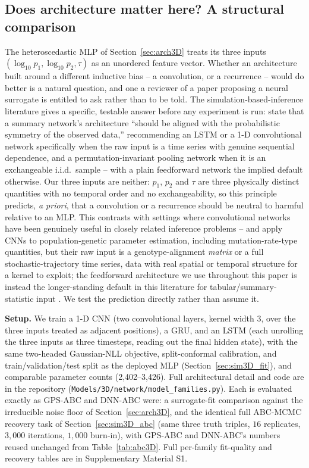 \documentclass[sn-basic,iicol,pdflatex]{sn-jnl}
\begin{document}
\subsection{Does architecture matter here? A structural comparison}
\label{sec:sim3D_arch}

The heteroscedastic MLP of Section~\ref{sec:arch3D} treats its three inputs
$(\log_{10}p_1,\log_{10}p_2,\tau)$ as an unordered feature vector. Whether an
architecture built around a different inductive bias -- a convolution, or a
recurrence -- would do better is a natural question, and one a reviewer of a
paper proposing a neural surrogate is entitled to ask rather than to be told. The
simulation-based-inference literature gives a specific, testable answer before
any experiment is run: \citet{radev2020} state that a summary network's
architecture ``should be aligned with the probabilistic symmetry of the
observed data,'' recommending an LSTM or a 1-D convolutional network
specifically when the raw input is a time series with genuine sequential
dependence, and a permutation-invariant pooling network when it is an
exchangeable i.i.d.\ sample -- with a plain feedforward network the implied
default otherwise. Our three inputs are neither: $p_1$, $p_2$ and $\tau$ are
three physically distinct quantities with no temporal order and no
exchangeability, so this principle predicts, \emph{a priori}, that
a convolution or a recurrence should be neutral to harmful relative to an MLP.
This contrasts with settings where convolutional networks have been genuinely
useful in closely related inference problems -- \citet{flagel2019} and
\citet{akesson2021} apply CNNs to population-genetic parameter estimation,
including mutation-rate-type quantities, but their raw input is a
genotype-alignment \emph{matrix} or a full stochastic-trajectory time series,
data with real spatial or temporal structure for a kernel to exploit; the
feedforward architecture we use throughout this paper is instead the
longer-standing default in this literature for tabular/summary-statistic input
\citep{sheehan2016,jiang2017}. We test the prediction directly rather than
assume it.

\noindent\textbf{Setup.} We train a 1-D CNN (two convolutional layers, kernel width
3, over the three inputs treated as adjacent positions), a GRU, and an LSTM
(each unrolling the three inputs as three timesteps, reading out the final
hidden state), with the same two-headed Gaussian-NLL objective, split-conformal
calibration, and train/validation/test split as the deployed MLP
(Section~\ref{sec:sim3D_fit}), and comparable parameter counts (2,402--3,426).
Full architectural detail and code are in the repository
(\texttt{Models/3D/network/model\_families.py}). Each is evaluated exactly
as GPS-ABC and DNN-ABC were: a surrogate-fit comparison against the
irreducible noise floor of Section~\ref{sec:arch3D}, and the identical full
ABC-MCMC recovery task of Section~\ref{sec:sim3D_abc} (same three truth
triples, $16$ replicates, $3{,}000$ iterations, $1{,}000$ burn-in), with
GPS-ABC and DNN-ABC's numbers reused unchanged from Table~\ref{tab:abc3D}.
Full per-family fit-quality and recovery tables are in Supplementary
Material S1.
\end{document}
